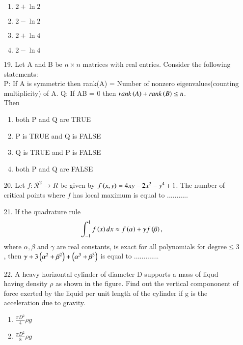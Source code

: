 \documentclass[journal]{IEEEtran}
\begin{document}
\begin{enumerate}
    \begin{enumerate}[label = (\Alph*)]
        \item $2+\ln 2$
        \item $2-\ln 2$
        \item $2+\ln 4$
        \item $2-\ln 4$
    \end{enumerate}
    \item[19.] Let A and B be $n\times n$ matrices with real entries. Consider the following statements:\\
    P: If A is symmetric then rank(A) = Number of nonzero eigenvalues(counting multiplicity) of A.
    Q: If AB = 0 then $rank\left(A\right) + rank\left(B\right)\leq n$.\\
    Then 
    \begin{enumerate}[label = (\Alph*)]
        \item both P and Q are TRUE
        \item P is TRUE and Q is FALSE 
        \item Q is TRUE and P is FALSE
        \item both P and Q are FALSE  
    \end{enumerate}
    \item[20.] Let $f:\mathcal{R}^2\to R$ be given by $f\left(x,y\right) = 4xy-2x^2-y^4+1$. The number of critical points where $f$ has local maximum is equal to ...........
    \item[21.] If the quadrature rule $$\int_{-1}^{1}f\left(x\right)dx\approx f\left(\alpha\right) + \gamma f\left(\beta\right),$$ where $\alpha,\beta$ and $\gamma$ are real constants, is exact for all polynomials for degree$\leq 3$, then $\gamma + 3\left(\alpha^2 + \beta^2\right) + \left(\alpha^3 + \beta^3\right)$ is equal to .............
    \item[22.] A heavy horizontal cylinder of diameter D supports a mass of liqud having density $\rho$ as shown in the figure. Find out the vertical compononent of force exerted by the liquid per unit length of the cylinder if g is the acceleration due to gravity.
    \begin{figure}[!ht]
        \centering
        \caption{}
    \end{figure}
    \begin{enumerate}[label = (\Alph*)]
        \item $\frac{\pi D^2}{4}\rho g$
        \item $\frac{\pi D^2}{8}\rho g$

\end{enumerate}
\end{enumerate}
\end{document}
